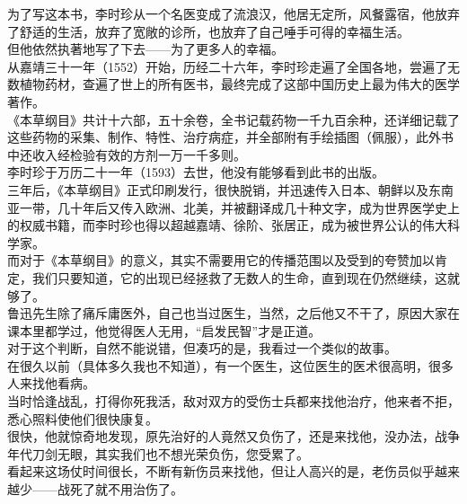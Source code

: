 \begin{multicols}{\theparacolNo}
为了写这本书，李时珍从一个名医变成了流浪汉，他居无定所，风餐露宿，他放弃了舒适的生活，放弃了宽敞的诊所，也放弃了自己唾手可得的幸福生活。\\

但他依然执著地写了下去——为了更多人的幸福。\\

从嘉靖三十一年（1552）开始，历经二十六年，李时珍走遍了全国各地，尝遍了无数植物药材，查遍了世上的所有医书，最终完成了这部中国历史上最为伟大的医学著作。\\

《本草纲目》共计十六部，五十余卷，全书记载药物一千九百余种，还详细记载了这些药物的采集、制作、特性、治疗病症，并全部附有手绘插图（佩服），此外书中还收入经检验有效的方剂一万一千多则。\\

李时珍于万历二十一年（1593）去世，他没有能够看到此书的出版。\\

三年后，《本草纲目》正式印刷发行，很快脱销，并迅速传入日本、朝鲜以及东南亚一带，几十年后又传入欧洲、北美，并被翻译成几十种文字，成为世界医学史上的权威书籍，而李时珍也得以超越嘉靖、徐阶、张居正，成为被世界公认的伟大科学家。\\

而对于《本草纲目》的意义，其实不需要用它的传播范围以及受到的夸赞加以肯定，我们只要知道，它的出现已经拯救了无数人的生命，直到现在仍然继续，这就够了。\\

鲁迅先生除了痛斥庸医外，自己也当过医生，当然，之后他又不干了，原因大家在课本里都学过，他觉得医人无用，“启发民智”才是正道。\\

对于这个判断，自然不能说错，但凑巧的是，我看过一个类似的故事。\\

在很久以前（具体多久我也不知道），有一个医生，这位医生的医术很高明，很多人来找他看病。\\

当时恰逢战乱，打得你死我活，敌对双方的受伤士兵都来找他治疗，他来者不拒，悉心照料使他们很快康复。\\

很快，他就惊奇地发现，原先治好的人竟然又负伤了，还是来找他，没办法，战争年代刀剑无眼，其实我们也不想光荣负伤，您受累了。\\

看起来这场仗时间很长，不断有新伤员来找他，但让人高兴的是，老伤员似乎越来越少——战死了就不用治伤了。\\


\end{multicols}
